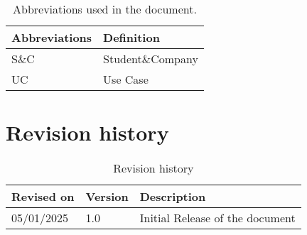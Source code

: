\begin{table}[H]
    \begin{center}
        \begin{tabular}{ |l|l| }
            \hline
            \textbf{Abbreviations} & \textbf{Definition}
            \\
            \hline
            S\&C    & Student\&Company \\
            \hline
            UC      & Use Case \\
            \hline
         \end{tabular}
        \caption{Abbreviations used in the document.}
        \label{tab:Abbreviations}%
    \end{center}
\end{table}

\section{Revision history}
\label{sec:revision_history}%
\label{sec:definition_acronyms_abbreviations}%
\begin{table}[H]
    \begin{center}
        \begin{tabular}{ |l|l|l|}
            \hline
            \textbf{Revised on} & \textbf{Version}   & \textbf{Description}                           \\
            \hline
            05/01/2025            & 1.0   &   Initial Release of the document  \\
            \hline
         \end{tabular}
         \caption{Revision history}
        \label{tab:acronyms}%
    \end{center}
\end{table}

\setcounter{bib}{1}
\newcommand{\cbib} {\thebib\stepcounter{bib}}

